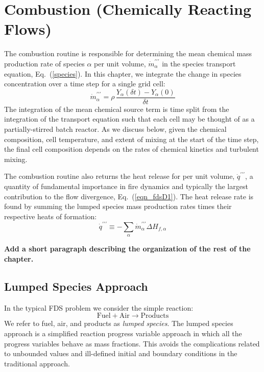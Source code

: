 \chapter{Combustion (Chemically Reacting Flows)}

\label{combustionsection}
The combustion routine is responsible for determining the mean chemical mass production rate of species $\alpha$ per unit volume, $\dot{m}^{\prime\prime\prime}_{\alpha}$ in the species transport equation, Eq.~(\ref{species}). In this chapter, we integrate the change in species concentration over a time step for a single grid cell:
\begin{equation}\label{eq:m_tprime_alpha}
\dot{m}^{\prime\prime\prime}_{\alpha}=\rho \,\frac{Y_\alpha(\delta t) - Y_\alpha(0)}{\delta t}
\end{equation}
The integration of the mean chemical source term is time split from the integration of the transport equation such that each cell may be thought of as a partially-stirred batch reactor.  As we discuss below, given the chemical composition, cell temperature, and extent of mixing at the start of the time step, the final cell composition depends on the rates of chemical kinetics and turbulent mixing.

The combustion routine also returns the heat release for per unit volume, $\dot{q}^{\prime\prime\prime}$, a quantity of fundamental importance in fire dynamics and typically the largest contribution to the flow divergence, Eq.~(\ref{eqn_fdsD1}).  The heat release rate is found by summing the lumped species mass production rates times their respective heats of formation:
\begin{equation}\label{eq:q_tprime}
\dot{q}^{\prime\prime\prime} \equiv -\displaystyle \sum_{\alpha} \dot{m}_\alpha^{\prime\prime\prime} \Delta H_{f,\alpha}
\end{equation}

{\bf Add a short paragraph describing the organization of the rest of the chapter.}


\section{Lumped Species Approach}
In the typical FDS problem we consider the simple reaction:
\begin{equation}\label{eq:simple}
\mathrm{Fuel + Air \rightarrow Products}
\end{equation}
We refer to fuel, air, and products as \emph{lumped species}.  The lumped species approach is a simplified reaction progress variable approach \cite{fox2003} in which all the progress variables behave as mass fractions. This avoids the complications related to unbounded values and ill-defined initial and boundary conditions in the traditional approach.

